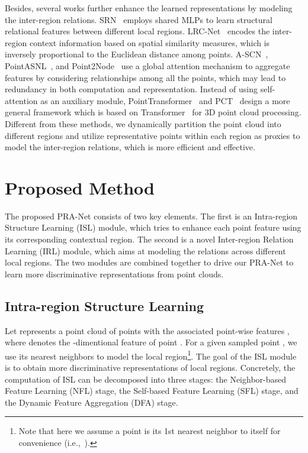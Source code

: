 \documentclass[journal]{IEEEtran}
\begin{document}
Besides, several works further enhance the learned representations by modeling the inter-region relations.
SRN~\cite{duan2019structural} employs shared MLPs to learn structural relational features between different local regions.
LRC-Net~\cite{liu2020lrc} encodes the inter-region context information based on spatial similarity measures, which is inversely proportional to the Euclidean distance among points. A-SCN~\cite{xie2018attentional}, PointASNL~\cite{yan2020pointasnl}, and Point2Node~\cite{han2020point2node} use a global attention mechanism to aggregate features by considering relationships among all the points, which may lead to redundancy in both computation and representation. Instead of using self-attention as an auxiliary module, PointTransformer~\cite{zhao2020point} and PCT~\cite{guo2020pct} design a more general framework which is based on Transformer~\cite{vaswani2017attention} for 3D point cloud processing.
Different from these methods, we dynamically partition the point cloud into different regions and utilize representative points within each region as proxies to model the inter-region relations, which is more efficient and effective.

\section{Proposed Method}\label{sec:method} 

The proposed PRA-Net consists of two key elements. The first is an Intra-region Structure Learning (ISL) module, which tries to enhance each point feature using its corresponding contextual region. The second is a novel Inter-region Relation Learning (IRL) module, which aims at modeling the relations across different local regions. The two modules are combined together to drive our PRA-Net to learn more discriminative representations from point clouds. 

\subsection{Intra-region Structure Learning}
\label{lef_module}

Let  represents a point cloud of  points with the associated point-wise features , where  denotes the -dimentional feature of point .
For a given sampled point , we use its  nearest neighbors  to model the local region\footnote{Note that here we assume a point is its 1st nearest neighbor to itself for convenience (i.e.,~).}. 
The goal of the ISL module is to obtain more discriminative representations of local regions.
Concretely, the computation of ISL can be decomposed into three stages: the Neighbor-based Feature Learning (NFL) stage, the Self-based Feature Learning (SFL) stage, and the Dynamic Feature Aggregation (DFA) stage.
\end{document}

